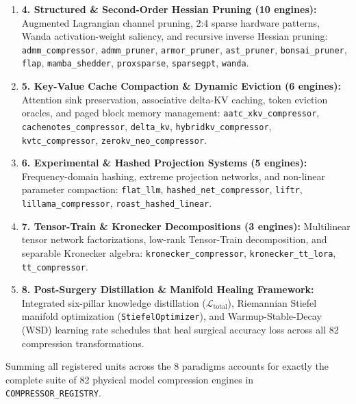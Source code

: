 \documentclass{article}
\begin{document}
\begin{enumerate}
    \item \textbf{4. Structured \& Second-Order Hessian Pruning (10 engines):}
    Augmented Lagrangian channel pruning, 2:4 sparse hardware patterns, Wanda activation-weight saliency, and recursive inverse Hessian pruning:
    \texttt{admm\_compressor},
    \texttt{admm\_pruner},
    \texttt{armor\_pruner},
    \texttt{ast\_pruner},
    \texttt{bonsai\_pruner},
    \texttt{flap},
    \texttt{mamba\_shedder},
    \texttt{proxsparse},
    \texttt{sparsegpt},
    \texttt{wanda}.

    \item \textbf{5. Key-Value Cache Compaction \& Dynamic Eviction (6 engines):}
    Attention sink preservation, associative delta-KV caching, token eviction oracles, and paged block memory management:
    \texttt{aatc\_xkv\_compressor},
    \texttt{cachenotes\_compressor},
    \texttt{delta\_kv},
    \texttt{hybridkv\_compressor},
    \texttt{kvtc\_compressor},
    \texttt{zerokv\_neo\_compressor}.

    \item \textbf{6. Experimental \& Hashed Projection Systems (5 engines):}
    Frequency-domain hashing, extreme projection networks, and non-linear parameter compaction:
    \texttt{flat\_llm},
    \texttt{hashed\_net\_compressor},
    \texttt{liftr},
    \texttt{lillama\_compressor},
    \texttt{roast\_hashed\_linear}.

    \item \textbf{7. Tensor-Train \& Kronecker Decompositions (3 engines):}
    Multilinear tensor network factorizations, low-rank Tensor-Train decomposition, and separable Kronecker algebra:
    \texttt{kronecker\_compressor},
    \texttt{kronecker\_tt\_lora},
    \texttt{tt\_compressor}.

    \item \textbf{8. Post-Surgery Distillation \& Manifold Healing Framework:}
    Integrated six-pillar knowledge distillation ($\mathcal{L}_{\text{total}}$), Riemannian Stiefel manifold optimization (\texttt{StiefelOptimizer}), and Warmup-Stable-Decay (WSD) learning rate schedules that heal surgical accuracy loss across all 82 compression transformations.
\end{enumerate}
Summing all registered units across the 8 paradigms accounts for exactly the complete suite of 82 physical model compression engines in \texttt{COMPRESSOR\_REGISTRY}.
\end{document}
